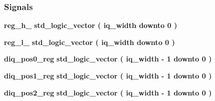 \subsubsection*{Signals}
 \begin{DoxyCompactItemize}
\item 
{\bf reg\+\_\+h\+\_} {\bfseries \textcolor{comment}{std\+\_\+logic\+\_\+vector}\textcolor{vhdlchar}{ }\textcolor{vhdlchar}{(}\textcolor{vhdlchar}{ }\textcolor{vhdlchar}{ }\textcolor{vhdlchar}{ }\textcolor{vhdlchar}{ }{\bfseries {\bf iq\+\_\+width}} \textcolor{vhdlchar}{ }\textcolor{keywordflow}{downto}\textcolor{vhdlchar}{ }\textcolor{vhdlchar}{ } \textcolor{vhdldigit}{0} \textcolor{vhdlchar}{ }\textcolor{vhdlchar}{)}\textcolor{vhdlchar}{ }} 
\item 
{\bf reg\+\_\+l\+\_} {\bfseries \textcolor{comment}{std\+\_\+logic\+\_\+vector}\textcolor{vhdlchar}{ }\textcolor{vhdlchar}{(}\textcolor{vhdlchar}{ }\textcolor{vhdlchar}{ }\textcolor{vhdlchar}{ }\textcolor{vhdlchar}{ }{\bfseries {\bf iq\+\_\+width}} \textcolor{vhdlchar}{ }\textcolor{keywordflow}{downto}\textcolor{vhdlchar}{ }\textcolor{vhdlchar}{ } \textcolor{vhdldigit}{0} \textcolor{vhdlchar}{ }\textcolor{vhdlchar}{)}\textcolor{vhdlchar}{ }} 
\item 
{\bf diq\+\_\+pos0\+\_\+reg} {\bfseries \textcolor{comment}{std\+\_\+logic\+\_\+vector}\textcolor{vhdlchar}{ }\textcolor{vhdlchar}{(}\textcolor{vhdlchar}{ }\textcolor{vhdlchar}{ }\textcolor{vhdlchar}{ }\textcolor{vhdlchar}{ }{\bfseries {\bf iq\+\_\+width}} \textcolor{vhdlchar}{-\/}\textcolor{vhdlchar}{ } \textcolor{vhdldigit}{1} \textcolor{vhdlchar}{ }\textcolor{keywordflow}{downto}\textcolor{vhdlchar}{ }\textcolor{vhdlchar}{ } \textcolor{vhdldigit}{0} \textcolor{vhdlchar}{ }\textcolor{vhdlchar}{)}\textcolor{vhdlchar}{ }} 
\item 
{\bf diq\+\_\+pos1\+\_\+reg} {\bfseries \textcolor{comment}{std\+\_\+logic\+\_\+vector}\textcolor{vhdlchar}{ }\textcolor{vhdlchar}{(}\textcolor{vhdlchar}{ }\textcolor{vhdlchar}{ }\textcolor{vhdlchar}{ }\textcolor{vhdlchar}{ }{\bfseries {\bf iq\+\_\+width}} \textcolor{vhdlchar}{-\/}\textcolor{vhdlchar}{ } \textcolor{vhdldigit}{1} \textcolor{vhdlchar}{ }\textcolor{keywordflow}{downto}\textcolor{vhdlchar}{ }\textcolor{vhdlchar}{ } \textcolor{vhdldigit}{0} \textcolor{vhdlchar}{ }\textcolor{vhdlchar}{)}\textcolor{vhdlchar}{ }} 
\item 
{\bf diq\+\_\+pos2\+\_\+reg} {\bfseries \textcolor{comment}{std\+\_\+logic\+\_\+vector}\textcolor{vhdlchar}{ }\textcolor{vhdlchar}{(}\textcolor{vhdlchar}{ }\textcolor{vhdlchar}{ }\textcolor{vhdlchar}{ }\textcolor{vhdlchar}{ }{\bfseries {\bf iq\+\_\+width}} \textcolor{vhdlchar}{-\/}\textcolor{vhdlchar}{ } \textcolor{vhdldigit}{1} \textcolor{vhdlchar}{ }\textcolor{keywordflow}{downto}\textcolor{vhdlchar}{ }\textcolor{vhdlchar}{ } \textcolor{vhdldigit}{0} \textcolor{vhdlchar}{ }\textcolor{vhdlchar}{)}\textcolor{vhdlchar}{ }} 

\end{DoxyCompactItemize}
